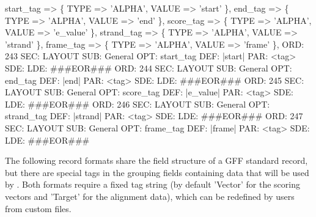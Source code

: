 \documentclass[11pt]{article}
\def\nwendcode{\endtrivlist \endgroup} %
\let\nwdocspar=\par                    %
\begin{document}
\label{sec:groupingfieldstagkeys}
\nwenddocs{}\plusendmoddef
start_tag                  => \{ TYPE => 'ALPHA', VALUE => 'start'    \},
end_tag                    => \{ TYPE => 'ALPHA', VALUE => 'end'      \},
score_tag                  => \{ TYPE => 'ALPHA', VALUE => 'e_value'  \},
strand_tag                 => \{ TYPE => 'ALPHA', VALUE => 'strand'   \},
frame_tag                  => \{ TYPE => 'ALPHA', VALUE => 'frame'    \},
\eatline
{}\nwendcode{}\plusendmoddef
ORD: 243
SEC: LAYOUT
SUB: General
OPT: start_tag
DEF: |start|
PAR: <tag>
SDE: 
LDE: 
###EOR###
ORD: 244
SEC: LAYOUT
SUB: General
OPT: end_tag
DEF: |end|
PAR: <tag>
SDE: 
LDE: 
###EOR###
ORD: 245
SEC: LAYOUT
SUB: General
OPT: score_tag
DEF: |e_value|
PAR: <tag>
SDE: 
LDE: 
###EOR###
ORD: 246
SEC: LAYOUT
SUB: General
OPT: strand_tag
DEF: |strand|
PAR: <tag>
SDE: 
LDE: 
###EOR###
ORD: 247
SEC: LAYOUT
SUB: General
OPT: frame_tag
DEF: |frame|
PAR: <tag>
SDE: 
LDE: 
###EOR###
\nwendcode{}\nwdocspar


The following record formats share the field structure of a GFF standard record, but there are special tags in the grouping fields containing data that will be used by {\prog}. Both formats require a fixed tag string (by default 'Vector' for the scoring vectors and 'Target' for the alignment data), which can be redefined by users from custom files.
\end{document}
